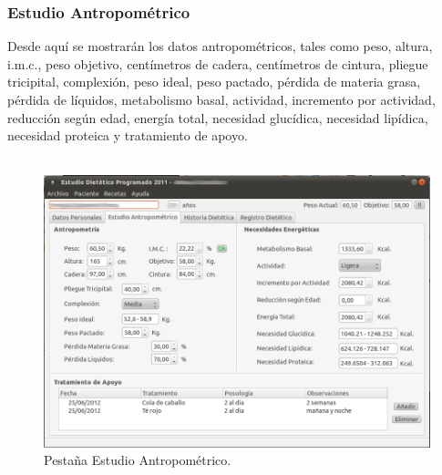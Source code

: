 \subsubsection{Estudio Antropométrico}
Desde aquí se mostrarán los datos antropométricos, tales como peso, altura, i.m.c., peso objetivo, centímetros de cadera, centímetros de cintura, pliegue tricipital, complexión, peso ideal, peso pactado, pérdida de materia grasa, pérdida de líquidos, metabolismo basal, actividad, incremento por actividad, reducción según edad, energía total, necesidad glucídica, necesidad lipídica, necesidad proteica y tratamiento de apoyo.\\\\
\begin{figure}[H]
  \label{nuevo_ingred_enfermedad}
  \begin{center}
    \includegraphics[scale=0.5]{../../Image/paciente-antrop.png}
  \end{center}
  \caption{Pestaña Estudio Antropométrico.}
\end{figure}

